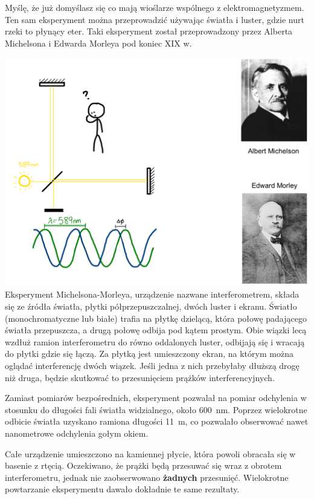 \documentclass[10pt,twocolumn,fleqn,polish]{article}
\begin{document}
Myślę, że już domyślasz się co mają wioślarze wspólnego z elektromagnetyzmem.
Ten sam eksperyment można przeprowadzić używając światła i luster,
gdzie nurt rzeki to płynący eter. Taki eksperyment został przeprowadzony
przez Alberta Michelsona i Edwarda Morleya pod koniec XIX w.
\newpage

\noindent\includegraphics[width=1\linewidth]{pages/STA-page12}
Eksperyment Michelsona-Morleya, urządzenie nazwane interferometrem,
składa się ze źródła światła, płytki półprzepuszczalnej, dwóch luster i ekranu.
Światło (monochromatyczne lub białe) trafia na płytkę dzielącą,
która połowę padającego światła przepuszcza, a drugą połowę odbija pod kątem prostym.
Obie wiązki lecą wzdłuż ramion interferometru do równo oddalonych luster,
odbijają się i wracają do płytki gdzie się łączą.
Za płytką jest umieszczony ekran, na którym można oglądać interferencję dwóch wiązek.
Jeśli jedna z nich przebyłaby dłuższą drogę niż druga, będzie skutkować
to przesunięciem prążków interferencyjnych.

Zamiast pomiarów bezpośrednich, eksperyment pozwalał na pomiar odchylenia w stosunku do
długości fali światła widzialnego, około \SI{600}{\nano\metre}.
Poprzez wielokrotne odbicie światła uzyskano ramiona długości \SI{11}{\metre},
co pozwalało obserwować nawet nanometrowe odchylenia gołym okiem.

Całe urządzenie umieszczono na kamiennej płycie, która powoli obracała się
w basenie z rtęcią. Oczekiwano, że prążki będą przesuwać się
wraz z obrotem interferometru, jednak nie zaobserwowano
\textbf{żadnych} przesunięć. Wielokrotne powtarzanie eksperymentu dawało
dokładnie te same rezultaty.
\newpage
\end{document}
